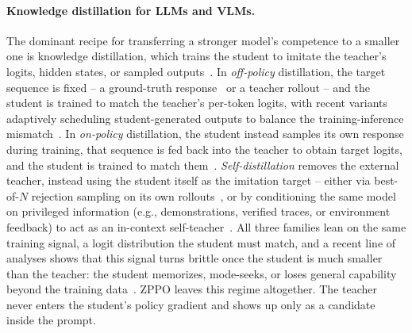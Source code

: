 \documentclass{llmxive}
\begin{document}
\paragraph{Knowledge distillation for LLMs and VLMs.}
The dominant recipe for transferring a stronger model's competence to a smaller one is knowledge distillation, which trains the student to imitate the teacher's logits, hidden states, or sampled outputs~\citep{gou2021knowledge}. In \emph{off-policy} distillation, the target sequence is fixed -- a ground-truth response~\citep{hinton2015distilling,sanh2019distilbert} or a teacher rollout -- and the student is trained to match the teacher's per-token logits, with recent variants adaptively scheduling student-generated outputs to balance the training-inference mismatch~\citep{ko2024distillm}. In \emph{on-policy} distillation, the student instead samples its own response during training, that sequence is fed back into the teacher to obtain target logits, and the student is trained to match them~\citep{gu2024minillm,agarwal2024policy,lu2025onpolicydistillation,fu2026revisiting,bousselham2025vold,yang2026learning,zhang2026fast,wu2026lightning}. \emph{Self-distillation} removes the external teacher, instead using the student itself as the imitation target -- either via best-of-$N$ rejection sampling on its own rollouts~\citep{zelikman2022star,singh2023beyond}, or by conditioning the same model on privileged information (e.g., demonstrations, verified traces, or environment feedback) to act as an in-context self-teacher~\citep{shenfeld2026self,zhao2026self,hubotter2026reinforcement,yang2026self,kim2026does}. All three families lean on the same training signal, a logit distribution the student must match, and a recent line of analyses shows that this signal turns brittle once the student is much smaller than the teacher: the student memorizes, mode-seeks, or loses general capability beyond the training data~\citep{kim2026does,li2026rethinking,song2026survey}. ZPPO leaves this regime altogether. The teacher never enters the student's policy gradient and shows up only as a candidate inside the prompt.
\end{document}
